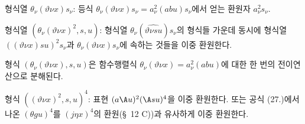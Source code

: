 
형식열 $\theta_\nu(\vartheta \nu x)s_\nu$: 등식 $\theta_\nu(\vartheta \nu x)s_\nu=a_\nu^2(abu)s_\nu$에서 얻는 환원자 $a_\nu^2s_\nu$.

형식열 $(\theta_\nu(\vartheta \nu x)^2,s,u)$: 형식열 $\theta_\nu(\widehat{\vartheta \nu su})s_\nu$의 형식들 가운데 동시에 형식열 $((\vartheta \nu x)su)^2s_\nu$과 $\theta_\nu(\vartheta \nu x)s_\nu$에 속하는 것들을 이중 환원한다.

형식 $(\theta_\nu(\vartheta \nu x),s,u)$은 함수행렬식 $\theta_\nu(\vartheta \nu x)=a_\nu^2(abu)$에 대한 한 번의 전이연산으로 분해된다.

형식 $((\vartheta \nu x)^2,s,u)^4$: 표현 $(a\A u)^2(\A su)^4$을 이중 환원한다. 또는 공식 (27.)에서 나온 $(\theta gu)^4$를 $(j\eta x)^4$의 환원(\S\ 12 C))과 유사하게 이중 환원한다.

